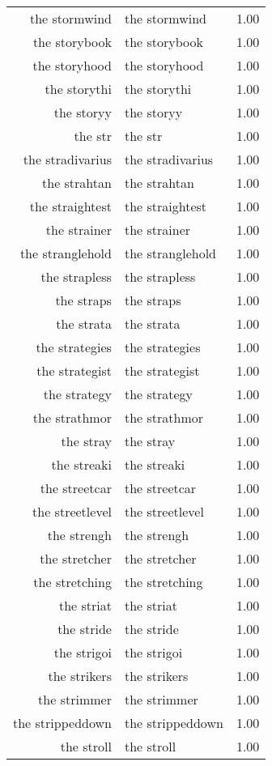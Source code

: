 \begin{table}[ht]
\begin{tabular}{rlr}
  the stormwind & the stormwind & 1.00 \\ 
  the storybook & the storybook & 1.00 \\ 
  the storyhood & the storyhood & 1.00 \\ 
  the storythi & the storythi & 1.00 \\ 
  the storyy & the storyy & 1.00 \\ 
  the str & the str & 1.00 \\ 
  the stradivarius & the stradivarius & 1.00 \\ 
  the strahtan & the strahtan & 1.00 \\ 
  the straightest & the straightest & 1.00 \\ 
  the strainer & the strainer & 1.00 \\ 
  the stranglehold & the stranglehold & 1.00 \\ 
  the strapless & the strapless & 1.00 \\ 
  the straps & the straps & 1.00 \\ 
  the strata & the strata & 1.00 \\ 
  the strategies & the strategies & 1.00 \\ 
  the strategist & the strategist & 1.00 \\ 
  the strategy & the strategy & 1.00 \\ 
  the strathmor & the strathmor & 1.00 \\ 
  the stray & the stray & 1.00 \\ 
  the streaki & the streaki & 1.00 \\ 
  the streetcar & the streetcar & 1.00 \\ 
  the streetlevel & the streetlevel & 1.00 \\ 
  the strengh & the strengh & 1.00 \\ 
  the stretcher & the stretcher & 1.00 \\ 
  the stretching & the stretching & 1.00 \\ 
  the striat & the striat & 1.00 \\ 
  the stride & the stride & 1.00 \\ 
  the strigoi & the strigoi & 1.00 \\ 
  the strikers & the strikers & 1.00 \\ 
  the strimmer & the strimmer & 1.00 \\ 
  the strippeddown & the strippeddown & 1.00 \\ 
  the stroll & the stroll & 1.00 \\ 

\end{tabular}
\end{table}
